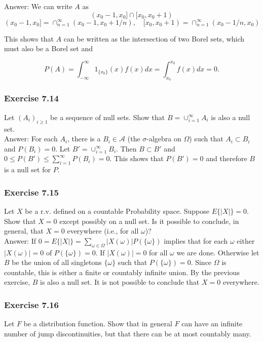 \documentclass{article}
\begin{document}
{Answer: We can write $A$ as 
$$
(x_0 - 1, x_0] \cap [x_0, x_0 + 1)
$$
$$
(x_0 - 1, x_0] = \cap_{n=1}^\infty (x_0 - 1, x_0 + 1/n),\quad [x_0, x_0 + 1) = \cap_{n=1}^\infty (x_0 - 1/n, x_0)$$

This shows that $A$ can be written as the intersection of two Borel sets, which must also be a Borel set and

$$
P(A) = \int_{-\infty}^\infty 1_{\{x_0\}}(x)f(x) dx = \int_{x_0}^{x_0} f(x) dx = 0 .
$$ 

\subsubsection*{Exercise 7.14}

Let $(A_i)_{i\geq 1}$ be a sequence of null sets. Show that $B = \cup_{i=1}^\infty A_i$ is also a null set.\\

Answer: For each $A_i$, there is a $B_i \in \mathcal{A}$ (the $\sigma$-algebra on $\Omega$) such that $A_i \subset B_i$ and $P(B_i) = 0$. Let $B' = \cup_{i=1}^\infty B_i$. Then $B \subset B'$ and $0 \leq P(B') \leq \sum_{i=1}^\infty P(B_i) = 0$. This shows that $P(B') = 0$ and therefore $B$ is a null set for $P$.  

\subsubsection*{Exercise 7.15}

Let $X$ be a r.v. defined on a countable Probability space. Suppose $E\{|X|\} = 0$. Show that $X = 0$ except possibly on a null set. Is it possible to conclude, in general, that $X = 0$ everywhere (i.e., for all $\omega$)? \\

Answer: If $0 = E\{|X|\} = \sum_{\omega \in \Omega} |X(\omega)|P(\{\omega\})$ implies that for each $\omega$ either $|X(\omega)| = 0$ of $P(\{\omega\}) = 0$. If $|X(\omega)| = 0$ for all $\omega$ we are done. Otherwise let $B$ be the union of all singletons $\{\omega\}$ such that $P(\{\omega\}) = 0$. Since $\Omega$ is countable, this is either a finite or countably infinite union. By the previous exercise, $B$ is also a null set. It is not possible to conclude that $X = 0$ everywhere. 

\subsubsection*{Exercise 7.16}

Let $F$ be a distribution function. Show that in general $F$ can have an infinite number of jump discontinuities, but that there can be at most countably many. \\

}
\end{document}
